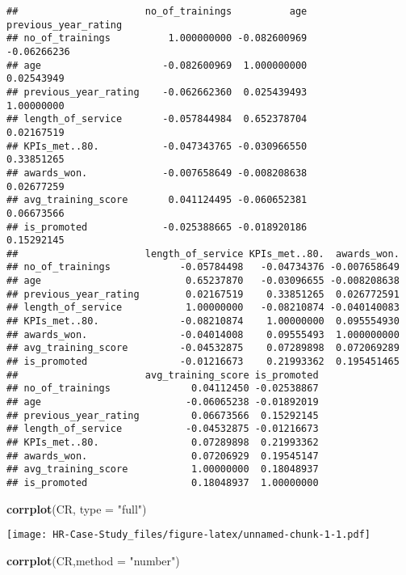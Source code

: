 \documentclass[
]{article}
\newenvironment{Shaded}{\begin{snugshade}}{\end{snugshade}}
\newcommand{\DataTypeTok}[1]{\textcolor[rgb]{0.13,0.29,0.53}{#1}}
\newcommand{\KeywordTok}[1]{\textcolor[rgb]{0.13,0.29,0.53}{\textbf{#1}}}
\newcommand{\NormalTok}[1]{#1}
\newcommand{\StringTok}[1]{\textcolor[rgb]{0.31,0.60,0.02}{#1}}
\begin{document}
\begin{verbatim}
##                      no_of_trainings          age previous_year_rating
## no_of_trainings          1.000000000 -0.082600969          -0.06266236
## age                     -0.082600969  1.000000000           0.02543949
## previous_year_rating    -0.062662360  0.025439493           1.00000000
## length_of_service       -0.057844984  0.652378704           0.02167519
## KPIs_met..80.           -0.047343765 -0.030966550           0.33851265
## awards_won.             -0.007658649 -0.008208638           0.02677259
## avg_training_score       0.041124495 -0.060652381           0.06673566
## is_promoted             -0.025388665 -0.018920186           0.15292145
##                      length_of_service KPIs_met..80.  awards_won.
## no_of_trainings            -0.05784498   -0.04734376 -0.007658649
## age                         0.65237870   -0.03096655 -0.008208638
## previous_year_rating        0.02167519    0.33851265  0.026772591
## length_of_service           1.00000000   -0.08210874 -0.040140083
## KPIs_met..80.              -0.08210874    1.00000000  0.095554930
## awards_won.                -0.04014008    0.09555493  1.000000000
## avg_training_score         -0.04532875    0.07289898  0.072069289
## is_promoted                -0.01216673    0.21993362  0.195451465
##                      avg_training_score is_promoted
## no_of_trainings              0.04112450 -0.02538867
## age                         -0.06065238 -0.01892019
## previous_year_rating         0.06673566  0.15292145
## length_of_service           -0.04532875 -0.01216673
## KPIs_met..80.                0.07289898  0.21993362
## awards_won.                  0.07206929  0.19545147
## avg_training_score           1.00000000  0.18048937
## is_promoted                  0.18048937  1.00000000
\end{verbatim}

\begin{Shaded}
\begin{Highlighting}[]
\KeywordTok{corrplot}\NormalTok{(CR, }\DataTypeTok{type =} \StringTok{"full"}\NormalTok{)}
\end{Highlighting}
\end{Shaded}

\texttt{[image: HR-Case-Study\_files/figure-latex/unnamed-chunk-1-1.pdf]}

\begin{Shaded}
\begin{Highlighting}[]
\KeywordTok{corrplot}\NormalTok{(CR,}\DataTypeTok{method =} \StringTok{"number"}\NormalTok{)}
\end{Highlighting}
\end{Shaded}
\end{document}
